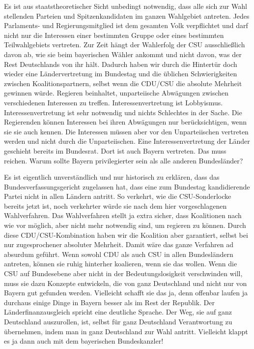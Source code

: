 Es ist aus staatstheoretischer Sicht unbedingt notwendig, dass alle sich zur Wahl stellenden
Parteien und Spitzenkandidaten im ganzen Wahlgebiet antreten. Jedes Parlaments- und
Regierungsmitglied ist dem gesamten Volk verpflichtet und darf nicht nur die Interessen einer
bestimmten Gruppe oder eines bestimmten Teilwahlgebiets vertreten. Zur Zeit hängt der Wahlerfolg
der CSU ausschließlich davon ab, wie sie beim bayerischen Wähler ankommt und nicht davon, was der
Rest Deutschlands von ihr hält. Dadurch haben wir durch die Hintertür doch wieder eine
Ländervertretung im Bundestag und die üblichen Schwierigkeiten zwischen Koalitionspartnern,
selbst wenn die CDU/CSU die absolute Mehrheit gewinnen würde. Regieren beinhaltet, unparteiische
Abwägungen zwischen verschiedenen Interessen zu treffen. Interessenvertretung ist Lobbyismus.
Interessenvertretung ist sehr notwendig und nichts Schlechtes in der Sache. Die Regierenden
können Interessen bei ihren Abwägungen nur berücksichtigen, wenn sie sie auch kennen. Die
Interessen müssen aber vor den Unparteiischen vertreten werden und nicht durch die Unparteiischen.
Eine Interessenvertretung der Länder geschieht bereits im Bundesrat. Dort ist auch Bayern
vertreten. Das muss reichen. Warum sollte Bayern privilegierter sein als alle anderen
Bundesländer?

Es ist eigentlich unverständlich und nur historisch zu erklären, dass das Bundesverfassungsgericht
zugelassen hat, dass eine zum Bundestag kandidierende Partei nicht in allen Ländern antritt.
So verkehrt, wie die CSU-Sonderlocke bereits jetzt ist, noch verkehrter würde sie nach dem hier
vorgeschlagenen Wahlverfahren. Das Wahlverfahren stellt ja extra sicher, dass Koalitionen nach
wie vor möglich, aber nicht mehr notwendig sind, um regieren zu können. Durch diese CDU/CSU-Kombination haben wir die Koalition aber garantiert, selbst bei nur zugesprochener absoluter
Mehrheit. Damit wäre das ganze Verfahren ad absurdum geführt. Wenn sowohl CDU als auch CSU in
allen Bundesländern antreten, können sie ruhig hinterher koalieren, wenn sie das wollen. Wenn die
CSU auf Bundesebene aber nicht in der Bedeutungslosigkeit verschwinden will, muss sie dazu
Konzepte entwickeln, die von ganz Deutschland und nicht nur von Bayern gut gefunden werden.
Vielleicht schafft sie das ja, denn offenbar laufen ja durchaus einige Dinge in Bayern besser als
im Rest der Republik. Der Länderfinanzausgleich spricht eine deutliche Sprache. Der Weg, sie auf
ganz Deutschland auszurollen, ist, selbst für ganz Deutschland Verantwortung zu übernehmen, indem
man in ganz Deutschland zur Wahl antritt. Vielleicht klappt es ja dann auch mit dem bayerischen
Bundeskanzler!

